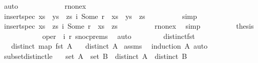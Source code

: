 \begin{isabellebody}
\ auto\isanewline
\ \ \ \ \isamarkupfalse%
\isanewline
\ \ \ \ \ \ \isamarkupfalse%
\ r{\isacharunderscore}nonex\isanewline
\ \ \ \ \ \ \isamarkupfalse%
\ \isamarkupfalse%
\ {\isachardoublequoteopen}insert{\isacharunderscore}spec\ {\isacharparenleft}xs\ {\isacharat}\ ys\ {\isacharat}\ zs{\isacharparenright}\ {\isacharparenleft}i{}{\isacharcomma}\ Some\ r{\isacharparenright}\ {\isacharequal}\ xs\ {\isacharat}\ ys\ {\isacharat}\ zs{\isachardoublequoteclose}\isanewline
\ \ \ \ \ \ \ \ \isamarkupfalse%
\ simp\isanewline
\ \ \ \ \ \ \isamarkupfalse%
\ \isamarkupfalse%
\ {\isachardoublequoteopen}insert{\isacharunderscore}spec\ {\isacharparenleft}xs\ {\isacharat}\ zs{\isacharparenright}\ {\isacharparenleft}i{}{\isacharcomma}\ Some\ r{\isacharparenright}\ {\isacharequal}\ xs\ {\isacharat}\ zs{\isachardoublequoteclose}\isanewline
\ \ \ \ \ \ \ \ \isamarkupfalse%
\ r{\isacharunderscore}nonex\ \isamarkupfalse%
\ simp\isanewline
\ \ \ \ \ \ \isamarkupfalse%
\ \isamarkupfalse%
\ {\isacharquery}thesis\isanewline
\ \ \ \ \ \ \ \ \isamarkupfalse%
\ {}\ {}\ {\isacartoucheopen}oper\ {\isacharequal}\ {\isacharparenleft}i{}{\isacharcomma}\ r{}{\isacharparenright}{\isacartoucheclose}\ snoc{\isachardot}prems\ \isamarkupfalse%
\ auto\isanewline
\ \ \ \ \isamarkupfalse%
\isanewline
\ \ \isamarkupfalse%
\isanewline
{}\isamarkupfalse%
%
\endisatagproof
{\isafoldproof}%
%
\isadelimproof
\isanewline
%
\endisadelimproof
\isanewline
{}\isamarkupfalse%
\ distinct{\isacharunderscore}fst{\isacharcolon}\isanewline
\ \ \ {\isachardoublequoteopen}distinct\ {\isacharparenleft}map\ fst\ A{\isacharparenright}{\isachardoublequoteclose}\isanewline
\ \ \ {\isachardoublequoteopen}distinct\ A{\isachardoublequoteclose}\isanewline
%
\isadelimproof
%
\endisadelimproof
%
\isatagproof
{}\isamarkupfalse%
\ assms\ \isamarkupfalse%
\ {\isacharparenleft}induction\ A{\isacharparenright}\ auto%
\endisatagproof
{\isafoldproof}%
%
\isadelimproof
\isanewline
%
\endisadelimproof
\isanewline
{}\isamarkupfalse%
\ subset{\isacharunderscore}distinct{\isacharunderscore}le{\isacharcolon}\isanewline
\ \ \ {\isachardoublequoteopen}set\ A\ {\isasymsubseteq}\ set\ B{\isachardoublequoteclose}\ \ {\isachardoublequoteopen}distinct\ A{\isachardoublequoteclose}\ \ {\isachardoublequoteopen}distinct\ B{\isachardoublequoteclose}\isanewline

\end{isabellebody}
